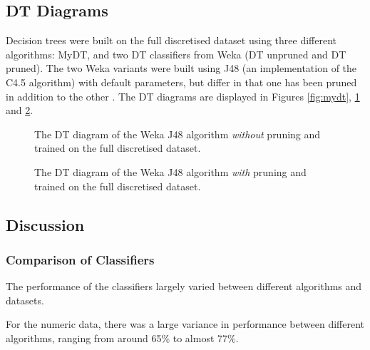 \subsection{DT Diagrams}
Decision trees were built on the full discretised dataset using three different algorithms: MyDT, and two DT classifiers from Weka (DT unpruned and DT pruned). The two Weka variants were built using J48 (an implementation of the C4.5 algorithm) with default parameters, but differ in that one has been pruned in addition to the other \cite{weka}. The DT diagrams are displayed in Figures \ref{fig:mydt}, \ref{fig:dt_unprune} and \ref{fig:dt_prune}.


\begin{figure}
    \begin{obeylines}
        
    \end{obeylines}
    \caption{The DT diagram of the Weka J48 algorithm \textit{without} pruning and trained on the full discretised dataset.\label{fig:dt_unprune}}
\end{figure}

\begin{figure}
    \begin{obeylines}
        
    \end{obeylines}
    \caption{The DT diagram of the Weka J48 algorithm \textit{with} pruning and trained on the full discretised dataset.\label{fig:dt_prune}}
\end{figure}


\subsection{Discussion}

\subsubsection{Comparison of Classifiers}


The performance of the classifiers largely varied between different algorithms and datasets. 

For the numeric data, there was a large variance in performance between different algorithms, ranging from around 65\% to almost 77\%. 

